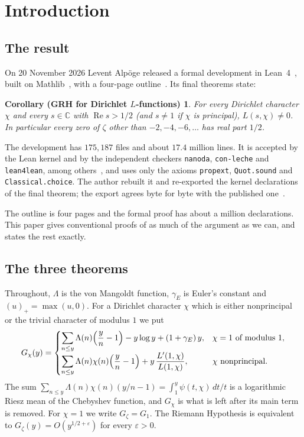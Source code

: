 \documentclass[11pt]{amsart}
\newcommand{\CC}{\mathbb{C}}
\newcommand{\eps}{\varepsilon}
\newcommand{\re}{\operatorname{Re}}
\newcommand{\gE}{\gamma_{E}}
\theoremstyle{plain}
\newtheorem*{maincor}{Corollary (GRH for Dirichlet $L$-functions)}
\theoremstyle{definition}
\numberwithin{equation}{section}
\begin{document}
\setcounter{tocdepth}{1}
\tableofcontents
\section{Introduction}\label{sec:intro}

\subsection{The result}

On 20 November 2026 Levent Alp\"oge released a formal development in Lean~4~\cite{lean4}, built on
Mathlib~\cite{mathlib}, with a four-page outline~\cite{alpoge-remark}. Its final theorems state:

\begin{maincor}
For every Dirichlet character $\chi$ and every $s\in\CC$ with $\re s>1/2$ (and $s\neq 1$ if $\chi$ is principal),
$L(s,\chi)\neq 0$. In particular every zero of $\zeta$ other than $-2,-4,-6,\dots$ has real part $1/2$.
\end{maincor}

The development has $175{,}187$ files and about $17.4$ million lines. It is accepted by the Lean
kernel and by the independent checkers \texttt{nanoda}, \texttt{con-leche} and \texttt{lean4lean},
among others~\cite{sutherland}, and uses only the axioms \texttt{propext}, \texttt{Quot.sound} and
\texttt{Classical.choice}. The author rebuilt it and re-exported the kernel declarations of the
final theorem; the export agrees byte for byte with the published one~\cite{dixit-repo}.

The outline is four pages and the formal proof has about a million declarations. This paper gives
conventional proofs of as much of the argument as we can, and states the rest exactly.

\subsection{The three theorems}

Throughout, $\Lambda$ is the von Mangoldt function, $\gE$ is Euler's constant and
$(u)_+=\max(u,0)$. For a Dirichlet character $\chi$ which is either nonprincipal or the trivial
character of modulus $1$ we put
\begin{equation}\label{eq:Gchi}
G_\chi(y)=
\begin{cases}
\displaystyle\sum_{n\le y}\Lambda(n)\Bigl(\frac yn-1\Bigr)-y\log y+(1+\gE)\,y, & \chi=1 \text{ of modulus } 1,\\[10pt]
\displaystyle\sum_{n\le y}\Lambda(n)\chi(n)\Bigl(\frac yn-1\Bigr)+y\,\frac{L'(1,\chi)}{L(1,\chi)}, & \chi \text{ nonprincipal}.
\end{cases}
\end{equation}
The sum $\sum_{n\le y}\Lambda(n)\chi(n)(y/n-1)=\int_1^y\psi(t,\chi)\,dt/t$ is a logarithmic
Riesz mean of the Chebyshev function, and $G_\chi$ is what is left after its main term is removed.
For $\chi=1$ we write $G_\zeta=G_1$. The Riemann Hypothesis is equivalent to
$G_\zeta(y)=O(y^{1/2+\eps})$ for every $\eps>0$.
\end{document}
